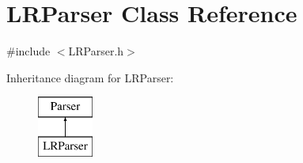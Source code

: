 \hypertarget{classLRParser}{\section{\-L\-R\-Parser \-Class \-Reference}
\label{d6/de9/classLRParser}
}


{\ttfamily \#include $<$\-L\-R\-Parser.\-h$>$}

\-Inheritance diagram for \-L\-R\-Parser\-:\begin{figure}[H]
\begin{center}
\leavevmode
\includegraphics[height=2.000000cm]{d6/de9/classLRParser}
\end{center}
\end{figure}
